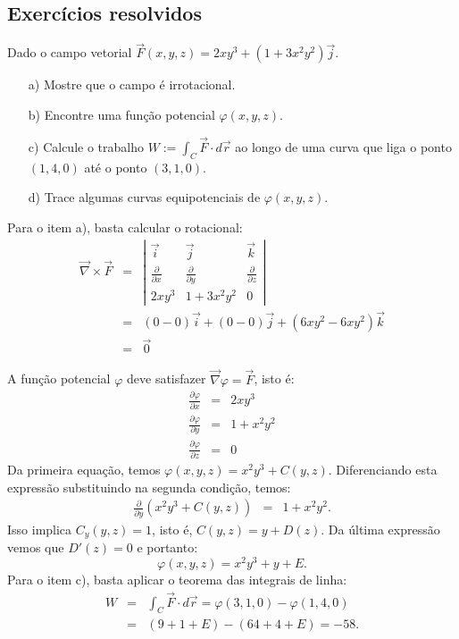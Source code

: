 \subsection*{Exercícios resolvidos}
\begin{exeresol}
  Dado o campo vetorial $\vec{F}(x,y,z) = 2xy^3+(1+3x^2y^2)\vec{j}$.
  \begin{itemize}
  \item[a)] Mostre que o campo é irrotacional.
  \item[b)] Encontre uma função potencial $\varphi(x,y,z)$.
  \item[c)] Calcule o trabalho $W:=\int_C \vec{F}\cdot d\vec{r}$ ao longo de uma curva que liga o ponto $(1,4,0)$ até o ponto $(3,1,0)$.
  \item[d)] Trace algumas curvas equipotenciais de $\varphi(x,y,z)$.
  \end{itemize}
\end{exeresol}
\begin{resol}
  Para o item a), basta calcular o rotacional:
  \begin{eqnarray*}
  \vec{\nabla}\times \vec{F} &=& \left|
  \begin{array}{ccc}
  \vec{i} & \vec{j} & \vec{k} \\
  \frac{\partial}{\partial x} & \frac{\partial}{\partial y} & \frac{\partial}{\partial z}\\
  2xy^3 & 1+3x^2y^2 & 0
  \end{array}
  \right| \\
  &=& \left(0-0\right)\vec{i} + \left(0-0\right)\vec{j} + \left(6xy^2-6xy^2\right)\vec{k}\\
  &=& \vec{0}
  \end{eqnarray*}
\end{resol}
A função potencial $\varphi$ deve satisfazer $\vec{\nabla}\varphi=\vec{F}$, isto é:
\begin{eqnarray*}
\frac{\partial \varphi}{\partial x} &=& 2xy^3 \\
\frac{\partial \varphi}{\partial y} &=& 1+x^2y^2 \\
\frac{\partial \varphi}{\partial z} &=& 0
\end{eqnarray*}
Da primeira equação, temos $\varphi(x,y,z)= x^2y^3+C(y,z)$. Diferenciando esta expressão substituindo na segunda condição, temos:
\begin{eqnarray*}
\frac{\partial }{\partial y}(x^2y^3+C(y,z)) &=& 1+x^2y^2.
\end{eqnarray*}
Isso implica $C_y(y,z)=1$, isto é, $C(y,z) = y+D(z)$. Da última expressão vemos que $D'(z)=0$ e portanto:
$$\varphi(x,y,z)=x^2y^3+y+E.$$
Para o item c), basta aplicar o teorema das integrais de linha:
\begin{eqnarray*}
W &=& \int_C \vec{F}\cdot d\vec{r} = \varphi(3,1,0)- \varphi(1,4,0)\\
  &=& (9+1+E) - (64+4+E) = -58.
\end{eqnarray*}
\construirExeresol


